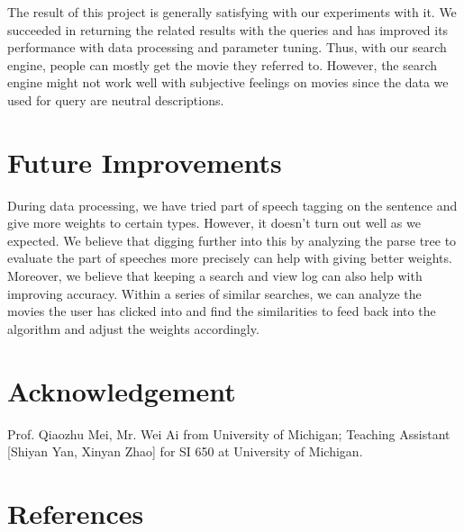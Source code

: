 \documentclass[letterpaper,10pt]{article}
\begin{document}
\begin{multicols}{2}
    The result of this project is generally satisfying with our experiments with
    it. We succeeded in returning the related results with the queries and has
    improved its performance with data processing and parameter tuning. Thus,
    with our search engine, people can mostly get the movie they referred to.
    However, the search engine might not work well with subjective feelings on
    movies since the data we used for query are neutral descriptions.

    \section{Future Improvements}
    During data processing, we have tried part of speech tagging on the sentence and give more weights to certain types. However, it doesn’t turn out well as we expected. We believe that digging further into this by analyzing the parse tree to evaluate the part of speeches more precisely can help with giving better weights.
    Moreover, we believe that keeping a search and view log can also help with improving accuracy. Within a series of similar searches, we can analyze the movies the user has clicked into and find the similarities to feed back into the algorithm and adjust the weights accordingly.

    \section{Acknowledgement}

    Prof. Qiaozhu Mei, Mr. Wei Ai from University of Michigan;
    Teaching Assistant [Shiyan Yan, Xinyan Zhao] for SI 650 at University of Michigan.

    \section*{References}





\end{multicols}
\end{document}
